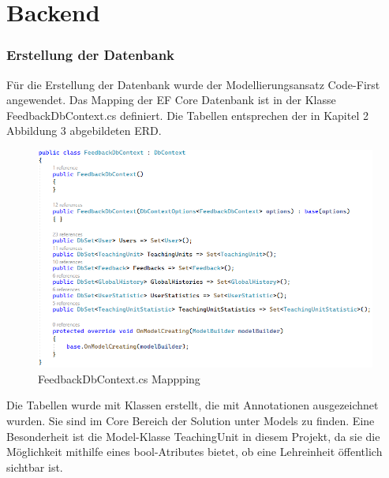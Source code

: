 \section{Backend}
\author{Stefano Pyringer}

\subsubsection{Erstellung der Datenbank}
Für die Erstellung der Datenbank wurde der Modellierungsansatz Code-First angewendet. 
Das Mapping der EF Core Datenbank ist in der Klasse FeedbackDbContext.cs definiert. Die Tabellen entsprechen der in Kapitel 2 Abbildung 3 
abgebildeten ERD.

\begin{figure}[h]
    \begin{center}
        \includegraphics[width=15cm]{./pics/Persistance/FeedbackDbContext.png}
    \caption[FeedbackDbContext]{FeedbackDbContext.cs Mappping}
    \end{center}
\end{figure}

Die Tabellen wurde 
mit Klassen erstellt, die mit Annotationen ausgezeichnet wurden. Sie sind im Core Bereich der Solution unter Models zu finden.
Eine Besonderheit ist die Model-Klasse TeachingUnit in diesem Projekt, da sie die Möglichkeit mithilfe eines bool-Atributes bietet, 
ob eine Lehreinheit öffentlich sichtbar ist.

